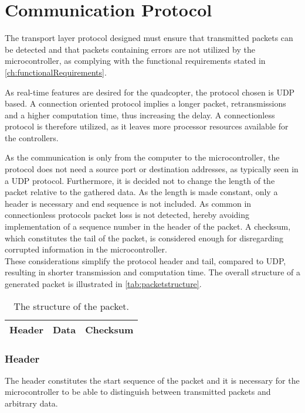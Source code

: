 \section{Communication Protocol}
The transport layer protocol designed must ensure that transmitted packets can be detected and that packets containing errors are not utilized by the microcontroller, as complying with the functional requirements stated in \autoref{ch:functionalRequirements}.

As real-time features are desired for the quadcopter, the protocol chosen is UDP based. A connection oriented protocol implies a longer packet, retransmissions and a higher computation time, thus increasing the delay. A connectionless protocol is therefore utilized, as it leaves more processor resources available for the controllers.

As the communication is only from the computer to the microcontroller, the protocol does not need a source port or destination addresses, as typically seen in a UDP protocol. Furthermore, it is decided not to change the length of the packet relative to the gathered data. As the length is made constant, only a header is necessary and end sequence is not included. As common in connectionless protocols packet loss is not detected, hereby avoiding implementation of a sequence number in the header of the packet. A checksum, which constitutes the tail of the packet, is considered enough for disregarding corrupted information in the microcontroller.\\
These considerations simplify the protocol header and tail, compared to UDP, resulting in shorter transmission and computation time. The overall structure of a generated packet is illustrated in \autoref{tab:packetstructure}.
\vspace{-0.2 cm}
\begin{table}[H]\centering
\begin{tabular}{|>{\centering\arraybackslash}m{3cm}|>{\centering\arraybackslash}m{2cm}|>{\centering\arraybackslash}m{2cm}|}
\hline
Header & Data & Checksum \\
\hline
\end{tabular}
\caption{The structure of the packet.}
\label{tab:packetstructure}
\end{table}
\vspace{-0.5 cm}
\subsubsection{Header}
The header constitutes the start sequence of the packet and it is necessary for the microcontroller to be able to distinguish between transmitted packets and arbitrary data. 
 
